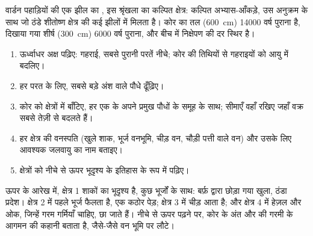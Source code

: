 \begin{omfigure}

{\small वार्डन पहाड़ियों की एक झील का , इस श्रृंखला का कल्पित
क्षेत्र: कल्पित अभ्यास-आँकड़े, उस अनुक्रम के साथ जो ठंडे शीतोष्ण क्षेत्र की कई
झीलों में मिलता है। कोर का तल (\qty{600}{cm})
\num{14000} वर्ष पुराना है, दिखाया गया शीर्ष (\qty{300}{cm}) \num{6000} वर्ष पुराना,
और बीच में निक्षेपण की दर स्थिर है।}
\end{omfigure}

\begin{method}[पराग-आरेख पढ़ना]
\begin{enumerate}
  \item ऊर्ध्वाधर अक्ष पढ़िए: गहराई, सबसे पुरानी परतें नीचे;
        कोर की तिथियों से गहराइयों को आयु में बदलिए।
  \item हर परत के लिए, सबसे बड़े अंश वाले पौधे ढूँढ़िए।
  \item कोर को क्षेत्रों में बाँटिए, हर एक के अपने प्रमुख
        पौधों के समूह के साथ; सीमाएँ वहाँ रखिए जहाँ वक्र सबसे तेज़ी से बदलते हैं।
  \item हर क्षेत्र की वनस्पति (खुले शाक, भूर्ज वनभूमि, चीड़
        वन, चौड़ी पत्ती वाले वन) और उसके लिए आवश्यक जलवायु का नाम बताइए।
  \item क्षेत्रों को नीचे से ऊपर भूदृश्य के इतिहास के रूप में पढ़िए।
\end{enumerate}
\end{method}

ऊपर के आरेख में, क्षेत्र 1 शाकों का भूदृश्य है, कुछ भूर्जों के साथ: बर्फ़ द्वारा छोड़ा गया
खुला, ठंडा प्रदेश। क्षेत्र 2 में पहले भूर्ज फैलता है, एक कठोर
पेड़; क्षेत्र 3 में चीड़ आता है; और क्षेत्र 4 में हेज़ल और ओक, जिन्हें गरम
गर्मियाँ चाहिए, छा जाते हैं। नीचे से ऊपर पढ़ने पर, कोर  के
अंत और  की गरमी के आगमन की कहानी बताता है, जैसे-जैसे
वन भूमि पर लौटे।

